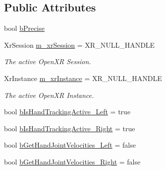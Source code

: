 \subsection*{Public Attributes}
\begin{DoxyCompactItemize}
\item 
bool \mbox{\hyperlink{class_open_x_r_provider_1_1_x_r_ext_hand_tracking_a9df35717b70f43e434b1ea5260cacf9d}{b\+Precise}}
\item 
Xr\+Session \mbox{\hyperlink{class_open_x_r_provider_1_1_x_r_ext_hand_tracking_ad70ffa469b47c4564a654b1437502c32}{m\+\_\+xr\+Session}} = X\+R\+\_\+\+N\+U\+L\+L\+\_\+\+H\+A\+N\+D\+LE
\begin{DoxyCompactList}\small\item\em The active Open\+XR Session. \end{DoxyCompactList}\item 
Xr\+Instance \mbox{\hyperlink{class_open_x_r_provider_1_1_x_r_ext_hand_tracking_a9b2aec405cd831212c9e971c27fc6b6a}{m\+\_\+xr\+Instance}} = X\+R\+\_\+\+N\+U\+L\+L\+\_\+\+H\+A\+N\+D\+LE
\begin{DoxyCompactList}\small\item\em The active Open\+XR Instance. \end{DoxyCompactList}\item 
bool \mbox{\hyperlink{class_open_x_r_provider_1_1_x_r_ext_hand_tracking_a3d5df4010b7cb00f02d99a5a5c6d942b}{b\+Is\+Hand\+Tracking\+Active\+\_\+\+Left}} = true
\item 
bool \mbox{\hyperlink{class_open_x_r_provider_1_1_x_r_ext_hand_tracking_ab55735a17be5e1105ecd2469db6c98f4}{b\+Is\+Hand\+Tracking\+Active\+\_\+\+Right}} = true
\item 
bool \mbox{\hyperlink{class_open_x_r_provider_1_1_x_r_ext_hand_tracking_ab3b404042d122b61a979e3aa7be9b35a}{b\+Get\+Hand\+Joint\+Velocities\+\_\+\+Left}} = false
\item 
bool \mbox{\hyperlink{class_open_x_r_provider_1_1_x_r_ext_hand_tracking_a60050ac72944124945273dd031f9c1b8}{b\+Get\+Hand\+Joint\+Velocities\+\_\+\+Right}} = false
\end{DoxyCompactItemize}
